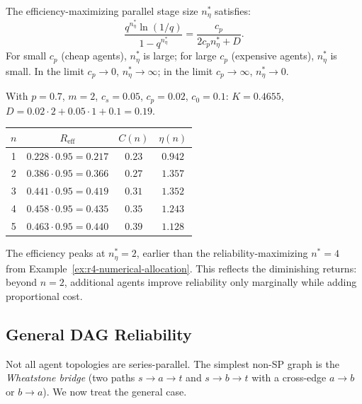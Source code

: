 \begin{corollary}
\label{cor:r4-efficiency-optimal-n}
The efficiency-maximizing parallel stage size $n^*_\eta$ satisfies:
\[
  \frac{q^{n^*_\eta} \ln(1/q)}{1 - q^{n^*_\eta}}
  = \frac{c_p}{2c_p n^*_\eta + D}.
\]
For small $c_p$ (cheap agents), $n^*_\eta$ is large; for large $c_p$ (expensive
agents), $n^*_\eta$ is small.  In the limit $c_p \to 0$, $n^*_\eta \to \infty$;
in the limit $c_p \to \infty$, $n^*_\eta \to 0$.
\end{corollary}

\begin{example}
\label{ex:r4-efficiency}
With $p = 0.7$, $m = 2$, $c_s = 0.05$, $c_p = 0.02$, $c_0 = 0.1$:
$K = 0.4655$, $D = 0.02 \cdot 2 + 0.05 \cdot 1 + 0.1 = 0.19$.

\begin{center}
\begin{tabular}{c|c|c|c}
$n$ & $R_{\mathrm{eff}}$ & $C(n)$ & $\eta(n)$ \\
\hline
1 & $0.228 \cdot 0.95 = 0.217$ & $0.23$ & $0.942$ \\
2 & $0.386 \cdot 0.95 = 0.366$ & $0.27$ & $1.357$ \\
3 & $0.441 \cdot 0.95 = 0.419$ & $0.31$ & $1.352$ \\
4 & $0.458 \cdot 0.95 = 0.435$ & $0.35$ & $1.243$ \\
5 & $0.463 \cdot 0.95 = 0.440$ & $0.39$ & $1.128$ \\
\end{tabular}
\end{center}
The efficiency peaks at $n^*_\eta = 2$, earlier than the reliability-maximizing
$n^* = 4$ from Example~\ref{ex:r4-numerical-allocation}.  This reflects the
diminishing returns: beyond $n = 2$, additional agents improve reliability only
marginally while adding proportional cost.
\end{example}

\subsection{General DAG Reliability}

Not all agent topologies are series-parallel.  The simplest non-SP graph is the
\emph{Wheatstone bridge} (two paths $s \to a \to t$ and $s \to b \to t$ with a
cross-edge $a \to b$ or $b \to a$).  We now treat the general case.

